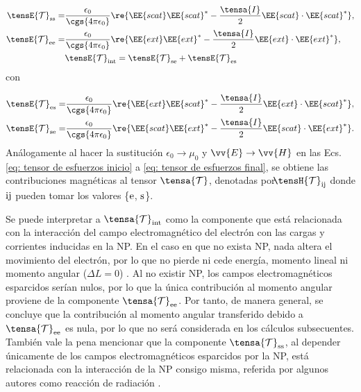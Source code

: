 \begin{align}
\tensE{\mathcal{T}}_{\rm ss} =& \frac{\epsilon_0}{\cgs{4\pi\epsilon_0}} \re{\EE{scat}\EE{scat}^{*}-\frac{\tensa{I}}{2}\EE{scat}\cdot\EE{scat}^{*}},\\
\tensE{\mathcal{T}}_{\rm ee} =& \frac{\epsilon_0}{\cgs{4\pi\epsilon_0}} \re{\EE{ext}\EE{ext}^{*}-\frac{\tensa{I}}{2}\EE{ext}\cdot\EE{ext}^{*}}, \\
&\tensE{\mathcal{T}}_{\rm int} = \tensE{\mathcal{T}}_{\rm se} + \tensE{\mathcal{T}}_{\rm es}
\end{align}
con

\begin{align}
\tensE{\mathcal{T}}_{\rm es} =& \frac{\epsilon_0}{\cgs{4\pi\epsilon_0}} \re{\EE{ext}\EE{scat}^{*}-\frac{\tensa{I}}{2}\EE{ext}\cdot\EE{scat}^{*}},\\
\tensE{\mathcal{T}}_{\rm se} =& \frac{\epsilon_0}{\cgs{4\pi\epsilon_0}} \re{\EE{scat}\EE{ext}^{*}-\frac{\tensa{I}}{2}\EE{scat}\cdot\EE{ext}^{*}}.
\label{eq: tensor de esfuerzos final}
\end{align}
Análogamente al hacer la sustitución $\epsilon_0 \to \mu_0$ y $\vv{E}\to\vv{H}$ en las Ecs. \eqref{eq: tensor de esfuerzos inicio} a \eqref{eq: tensor de esfuerzos final}, se obtiene las contribuciones magnéticas al tensor $\tensa{\mathcal{T}}$, denotadas por $\hspace{-0.6 em}\tensH{\mathcal{T}}_{\rm ij}$ donde $\rm ij$ pueden tomar los valores \{$\rm e$, $\rm s$\}.

Se puede interpretar a $\tensa{\mathcal{T}}_{\rm int}$ como la componente que está relacionada con la interacción del campo electromagnético del electrón con las cargas y corrientes inducidas en la NP. En el caso en que no exista NP, nada altera el movimiento del electrón, por lo que no pierde ni cede energía, momento lineal ni momento angular ($\Delta L = 0$) \cite{castellanos2021phdthesis}. Al no existir NP, los campos electromagnéticos esparcidos serían nulos, por lo que la única contribución al momento angular proviene de la componente $\tensa{\mathcal{T}}_{\rm ee}$. Por tanto, de manera general, se concluye que la contribución al momento angular transferido debido a $\tensa{\mathcal{T}}_{\rm ee}$ es nula, por lo que no será considerada en los cálculos subsecuentes. También vale la pena mencionar que la componente $\tensa{\mathcal{T}}_{\rm ss}$, al depender únicamente de los campos electromagnéticos esparcidos por la NP, está relacionada con la interacción de la NP consigo misma, referida por algunos autores como reacción de radiación \cite{jackson}.  

